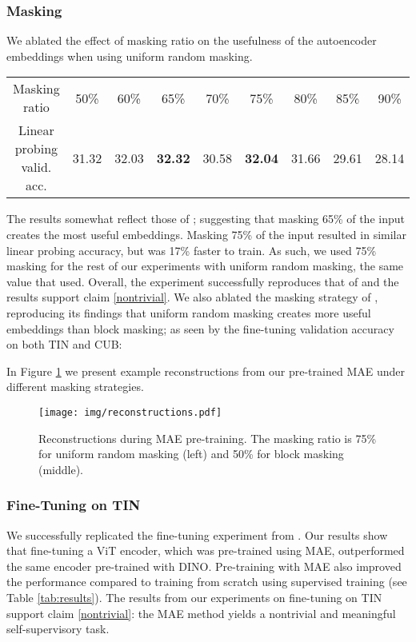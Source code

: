 \subsubsection{Masking}
We ablated the effect of masking ratio on the usefulness of the autoencoder embeddings when using uniform random masking.
\begin{center}\vspace{-.2em}
\begin{tabular}{ c c c c c c c c c }
Masking ratio & 50\% & 60\% & 65\% & 70\% & 75\% & 80\% & 85\% & 90\% \\
\shline
Linear probing valid. acc. & 31.32 & 32.03 & \textbf{32.32} & 30.58 & \textbf{32.04} & 31.66 & 29.61 & 28.14 \\
\end{tabular}\vspace{-.2em}
\end{center}
The results somewhat reflect those of \cite{mae}; suggesting that masking 65\% of the input creates the most useful embeddings. Masking 75\% of the input resulted in similar linear probing accuracy, but was 17\% faster to train. As such, we used 75\% masking for the rest of our experiments with uniform random masking, the same value that \cite{mae} used. Overall, the experiment successfully reproduces that of \cite{mae} and the results support claim \ref{nontrivial}. We also ablated the masking strategy of \cite{mae}, reproducing its findings that uniform random masking creates more useful embeddings than block masking; as seen by the fine-tuning validation accuracy on both TIN and CUB:

In Figure \ref{fig:recon} we present example reconstructions from our pre-trained MAE under different masking strategies. 

\begin{figure}
    \centering
    \texttt{[image: img/reconstructions.pdf]}
    \vspace{-2mm}
    \caption{Reconstructions during MAE pre-training. The masking ratio is 75\% for uniform random masking (left) and 50\% for block masking (middle).}
    \label{fig:recon}
\end{figure}

\subsubsection{Fine-Tuning on TIN}
We successfully replicated the fine-tuning experiment from \cite{mae}. Our results show that fine-tuning a ViT encoder, which was pre-trained using MAE, outperformed the same encoder pre-trained with DINO. Pre-training with MAE also improved the performance compared to training from scratch using supervised training (see Table \ref{tab:results}). The results from our experiments on fine-tuning on TIN support claim \ref{nontrivial}: the MAE method yields a nontrivial and meaningful self-supervisory task.

